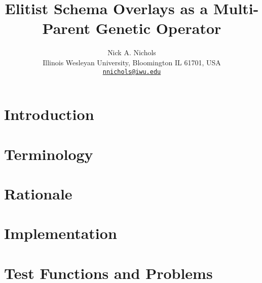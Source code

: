 \documentclass{article}
\makeatletter
\def \papertitle {Elitist Schema Overlays as a Multi-Parent Genetic Operator}
\def \paperauthors {Nick A. Nichols}
\def \paperinstitute {\small Illinois Wesleyan University, Bloomington IL 61701, USA}
\def \paperemails {\small\href{mailto:nnichols@iwu.edu}{\nolinkurl{nnichols@iwu.edu}}}
\makeatother
\begin{document}
\title{\papertitle}
\author{\paperauthors \\ \paperinstitute \\ \paperemails}

\maketitle


\begin{abstract}

\end{abstract}








\section{Introduction} 
\label{sec:introduction}



\section{Terminology} 
\label{sec:terminology}



\section{Rationale}
\label{sec:rationale}



\section{Implementation}
\label{sec:implementation}



\section{Test Functions and Problems}
\label{sec:testfunctions}

\end{document}
